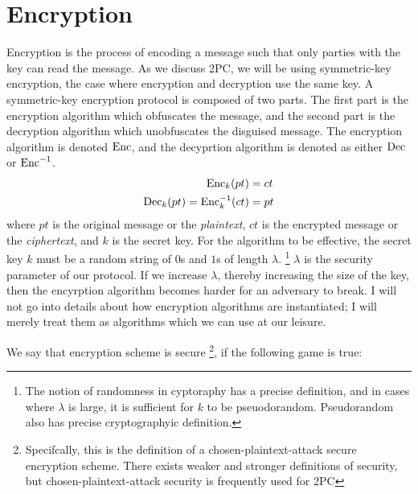 \section{Encryption}
Encryption is the process of encoding a message such that only parties with the key can read the message.
As we discuss 2PC, we will be using symmetric-key encryption, the case where encryption and decryption use the same key.
A symmetric-key encryption protocol is composed of two parts.
The first part is the encryption algorithm which obfuscates the message, and the second part is the decryption algorithm which unobfuscates the disguised message.
The encryption algorithm is denoted $\operatorname{Enc}$, and the decyprtion algorithm is denoted as either $\operatorname{Dec}$ or $\operatorname{Enc}^{-1}$.
\begin{equation}
    \label{eqn:encryption}
    \begin{split}
        \operatorname{Enc}_k (pt) & = ct  \\
        \operatorname{Dec}_k(pt) = \operatorname{Enc}^{-1}_k(ct) & = pt
    \end{split}
\end{equation}
where $pt$ is the original message or the \emph{plaintext}, $ct$ is the encrypted message or the \emph{ciphertext}, and $k$ is the secret key.
For the algorithm to be effective, the secret key $k$ must be a random string of $0$s and $1$s of length $\lambda$.
\footnote{The notion of randomness in cyptoraphy has a precise definition, and in cases where $\lambda$ is large, it is sufficient for $k$ to be pseuodorandom. Pseudorandom also has precise cryptographyic definition.}
$\lambda$ is the security parameter of our protocol.
If we increase $\lambda$, thereby increasing the size of the key, then the encyrption algorithm becomes harder for an adversary to break.
I will not go into details about how encryption algorithms are instantiated; I will merely treat them as algorithms which we can use at our leisure.

We say that encryption scheme is secure \footnote{Specifcally, this is the definition of a chosen-plaintext-attack secure encryption scheme. There exists weaker and stronger definitions of security, but chosen-plaintext-attack security is frequently used for 2PC}, if the following game is true:

